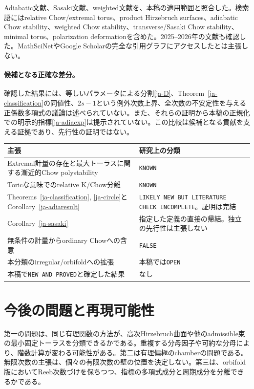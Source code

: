 \documentclass[12pt]{amsart}
\theoremstyle{definition}
\theoremstyle{remark}
\numberwithin{equation}{section}
\begin{document}
Adiabatic文献\cite{ja-DS19,ja-DS20,ja-Hal20,ja-Hat}、Sasaki文献\cite{ja-CS,ja-BvC}、weighted文献\cite{ja-Lah,ja-Hal23,ja-AJL,ja-Has25}を、本稿の適用範囲と照合した。検索語にはrelative Chow/extremal torus、product Hirzebruch surfaces、adiabatic Chow stability、weighted Chow stability、transverse/Sasaki Chow stability、minimal torus、polarization deformationを含めた。2025--2026年の文献\cite{ja-BJ25,ja-Tru26,ja-LY26,ja-Jub26}も確認した。MathSciNetやGoogle Scholarの完全な引用グラフにアクセスしたとは主張しない。

\paragraph{候補となる正確な差分。}
確認した結果には、等しいパラメータによる分割\eqref{ja-D}、Theorem~\ref{ja-classification}の同値性、$2s-1$という例外次数上界、全次数の不安定性を与える正係数多項式の議論は述べられていない。また、それらの証明から本稿の正規化での明示的指標\eqref{ja-adiaexp}は提示されていない。この比較は候補となる貢献を支える証拠であり、先行性の証明ではない。

\begingroup\small
\begin{longtable}{p{}p{}}
\hline
主張 & 研究上の分類\\ \hline
Extremal計量の存在と最大トーラスに関する漸近的Chow polystability & \texttt{KNOWN}\\
Toricな意味でのrelative K/Chow分離 & \texttt{KNOWN}\\
Theorems~\ref{ja-classification}, \ref{ja-circle}とCorollary~\ref{ja-adiaresult} & \texttt{LIKELY NEW BUT LITERATURE CHECK INCOMPLETE}。証明は完結\\
Corollary~\ref{ja-sasaki} & 指定した定義の直接の帰結。独立の先行性は主張しない\\
無条件の計量からordinary Chowへの含意 & \texttt{FALSE}\\
本分類のirregular/orbifoldへの拡張 & 本稿では\texttt{OPEN}\\
本稿で\texttt{NEW AND PROVED}と確定した結果 & なし\\ \hline
\end{longtable}
\endgroup

\section{今後の問題と再現可能性}
第一の問題は、同じ有理関数の方法が、高次Hirzebruch曲面や他のadmissible束の最小固定トーラスを分類できるかである。重複する分母因子や可約な分母により、階数計算が変わる可能性がある。第二は有理偏極のchamberの問題である。無限次数の主張は、個々の有限次数の壁の位置を決定しない。第三は、orbifold版においてReeb次数づけを保ちつつ、指標の多項式成分と周期成分を分離できるかである。
\end{document}
